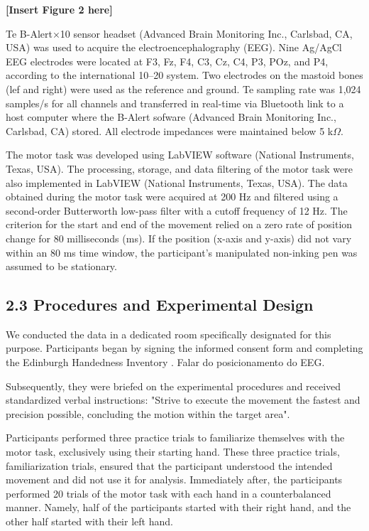 \documentclass[man,a4paper,12pt,floatsintext]{apa6}
\begin{document}
\begin{center}
\textbf{[Insert Figure 2 here]}
\end{center}


Te B-Alert×10 sensor headset (Advanced Brain Monitoring Inc., Carlsbad, CA, USA) was used to acquire the electroencephalography (EEG). Nine Ag/AgCl EEG electrodes were located at F3, Fz, F4, C3, Cz, C4, P3, POz, and P4, according to the international 10–20 system. Two electrodes on the mastoid bones (lef and right) were used as the reference and ground. Te sampling rate was 1,024 samples/s for all channels and transferred in real-time via Bluetooth link to a host computer where the B-Alert sofware (Advanced Brain Monitoring Inc., Carlsbad, CA) stored. All electrode impedances were maintained below 5 k$\Omega$.  


The motor task was developed using LabVIEW software (National Instruments, Texas, USA). The processing, storage, and data filtering of the motor task were also implemented in LabVIEW (National Instruments, Texas, USA). The data obtained during the motor task were acquired at 200 Hz and filtered using a second-order Butterworth low-pass filter with a cutoff frequency of 12 Hz. The criterion for the start and end of the movement relied on a zero rate of position change for 80 milliseconds (ms). If the position (x-axis and y-axis) did not vary within an 80 ms time window, the participant's manipulated non-inking pen was assumed to be stationary. 

\subsection{2.3 Procedures and Experimental Design}
	
We conducted the data in a dedicated room specifically designated for this purpose. Participants began by signing the informed consent form and completing the Edinburgh Handedness Inventory \citep{Oldfield1971a}. Falar do posicionamento do EEG. 


Subsequently, they were briefed on the experimental procedures and received standardized verbal instructions: "Strive to execute the movement the fastest and precision possible, concluding the motion within the target area".

Participants performed three practice trials to familiarize themselves with the motor task, exclusively using their starting hand. These three practice trials, familiarization trials, ensured that the participant understood the intended movement and did not use it for analysis. Immediately after, the participants performed 20 trials of the motor task with each hand in a counterbalanced manner. Namely, half of the participants started with their right hand, and the other half started with their left hand.
\end{document}
